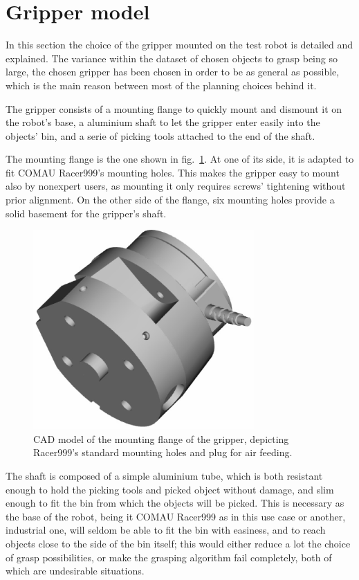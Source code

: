\section{Gripper model}
In this section the choice of the gripper mounted on the test robot is detailed
and explained. The variance within the dataset of chosen objects to grasp being
so large, the chosen gripper has been chosen in order to be as general as
possible, which is the main reason between most of the planning choices behind
it.

The gripper consists of a mounting flange to quickly mount and
dismount it on the robot's base, a aluminium shaft to let the gripper enter
easily into the objects' bin, and a serie of picking tools attached to the end
of the shaft.

The mounting flange is the one shown in fig.~\ref{fig:mounting-flange}. At one
of its side, it is adapted to fit COMAU Racer999's mounting holes. This makes
the gripper easy to mount also by nonexpert users, as mounting it only requires
screws' tightening without prior alignment. On the other side of the flange,
six mounting holes provide a solid basement for the gripper's shaft. 

\begin{figure}[htbp]
  \centering
  \includegraphics[height=3in]{./Graphics/gripper_flange}
  \caption{CAD model of the mounting flange of the gripper, depicting
  Racer999's standard mounting holes and plug for air feeding. \label{fig:mounting-flange}}
\end{figure}

The shaft is composed of a simple aluminium tube, which is both resistant enough
to hold the picking tools and picked object without damage, and slim enough to
fit the bin from which the objects will be picked. This is necessary as the
base of the robot, being it COMAU Racer999 as in this use case or another,
industrial one, will seldom be able to fit the bin with easiness, and to reach
objects close to the side of the bin itself; this would either reduce a lot the
choice of grasp possibilities, or make the grasping algorithm fail completely,
both of which are undesirable situations.

